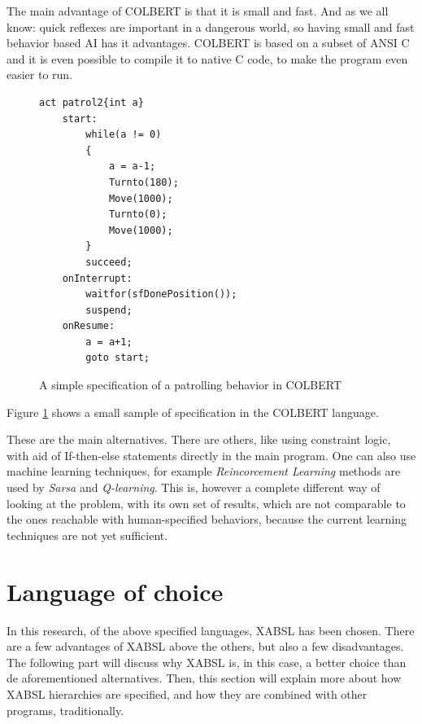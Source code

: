 \documentclass[a4paper,10pt]{article}
\begin{document}
The main advantage of COLBERT is that it is small and fast. And as we all know:
quick reflexes are important in a dangerous world, so having small and fast
behavior based AI has it advantages. COLBERT is based on a subset of ANSI C and
it is even possible to compile it to native C code, to make the program even
easier to run.

\begin{figure}
\centering
\begin{lstlisting}
act patrol2{int a}
    start: 
        while(a != 0)
        {
            a = a-1;
            Turnto(180);
            Move(1000);
            Turnto(0);
            Move(1000);
        }
        succeed;
    onInterrupt:
        waitfor(sfDonePosition());
        suspend;
    onResume:
        a = a+1;
        goto start;
\end{lstlisting}
    \caption{A simple specification of a patrolling behavior in COLBERT}
    \label{fig:colbert}
\end{figure}

Figure \ref{fig:colbert} shows a small sample of specification in the COLBERT
language. 

These are the main alternatives. There are others, like using constraint logic,
with aid of If-then-else statements directly in the main program. One can also
use machine learning techniques, for example \textit{Reincorcement Learning}
methods are used by \textit{Sarsa} and \textit{Q-learning}. This is, however a
complete different way of looking at the problem, with its own set of results,
which are not comparable to the ones reachable with human-specified behaviors,
because the current learning techniques are not yet sufficient.

\section{Language of choice}
\label{sec:xabsl-focus}
In this research, of the above specified languages, XABSL has been chosen. There
are a few advantages of XABSL above the others, but also a few disadvantages.
The following part will discuss why XABSL is, in this case, a better choice than
de aforementioned alternatives. Then, this section will explain more about how
XABSL hierarchies are specified, and how they are combined with other programs,
traditionally.
\end{document}
